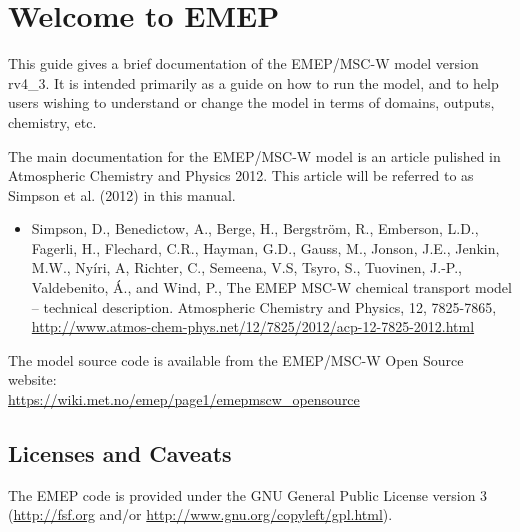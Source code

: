 
\chapter{Welcome to EMEP }

This guide gives a brief documentation of the EMEP/MSC-W model
version rv4\_3. 
It is intended primarily as a guide on how to run the model, and
to help users wishing to understand or change 
the model in terms of domains, outputs, chemistry, etc.


The main documentation for the EMEP/MSC-W model is an article pulished 
in Atmospheric Chemistry and Physics 2012. %
This article will be referred to as Simpson et al. (2012) in
this manual. 


\begin{itemize}
\item
Simpson, D., Benedictow, A., Berge, H., Bergstr\"om, R., Emberson, L.D., Fagerli, H., Flechard, C.R., Hayman, G.D., Gauss, M., Jonson, J.E., Jenkin, M.W., Ny\'iri, A, Richter, C., Semeena, V.S, Tsyro, S., Tuovinen, J.-P., Valdebenito, \'A., and Wind, P.,
The EMEP MSC-W chemical transport model – technical description. 
Atmospheric Chemistry and Physics, 12, 7825-7865,
\url{http://www.atmos-chem-phys.net/12/7825/2012/acp-12-7825-2012.html}
\end{itemize}


The model source code is available from the EMEP/MSC-W Open Source website:\\ 
\url{https://wiki.met.no/emep/page1/emepmscw_opensource}

\newpage

\section{Licenses and Caveats}

The EMEP code is provided under the GNU General Public License version 3
(\url{http://fsf.org} and/or
\url{http://www.gnu.org/copyleft/gpl.html}).

